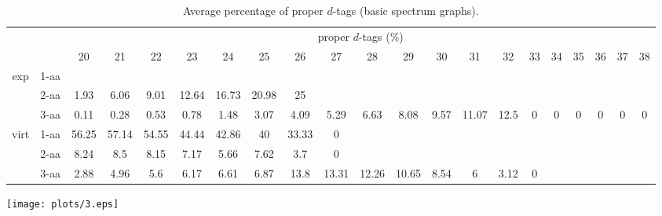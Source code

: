 \documentclass{article}
\begin{document}
\begin{table}[h]\tiny
\vspace{3mm}
{\centering
\begin{center}
\begin{tabular}{|c|l|c|c|c|c|c|c|c|c|c|c|c|c|c|c|c|c|c|c|c|}
  \hline
  \multicolumn{2}{|c|}{ } & \multicolumn{ 19 }{|c|}{ proper $d$-tags (\%)} \\
  \cline{3- 21}
  \multicolumn{2}{|c|}{ }  & 20 & 21 & 22 & 23 & 24 & 25 & 26 & 27 & 28 & 29 & 30 & 31 & 32 & 33 & 34 & 35 & 36 & 37 & 38\\
  \hline
  \multirow{3}{*}{exp}
&  1-aa  &  &  &  &  &  &  &  &  &  &  &  &  &  &  &  &  &  &  & \\&  2-aa  & 1.93 & 6.06 & 9.01 & 12.64 & 16.73 & 20.98 & 25 &  &  &  &  &  &  &  &  &  &  &  & \\&  3-aa  & 0.11 & 0.28 & 0.53 & 0.78 & 1.48 & 3.07 & 4.09 & 5.29 & 6.63 & 8.08 & 9.57 & 11.07 & 12.5 & 0 & 0 & 0 & 0 & 0 & 0\\ \hline
  \multirow{3}{*}{virt} 
&  1-aa  & 56.25 & 57.14 & 54.55 & 44.44 & 42.86 & 40 & 33.33 & 0 &  &  &  &  &  &  &  &  &  &  & \\&  2-aa  & 8.24 & 8.5 & 8.15 & 7.17 & 5.66 & 7.62 & 3.7 & 0 &  &  &  &  &  &  &  &  &  &  & \\&  3-aa  & 2.88 & 4.96 & 5.6 & 6.17 & 6.61 & 6.87 & 13.8 & 13.31 & 12.26 & 10.65 & 8.54 & 6 & 3.12 & 0 &  &  &  &  & \\ \hline
\end{tabular}
\end{center}
\par}
\centering
\caption{ Average percentage of proper $d$-tags (basic spectrum graphs).}
\vspace{3mm}
\label{table:proper-d-tags}
\end{table}


\texttt{[image: plots/3.eps]}
\end{document}
